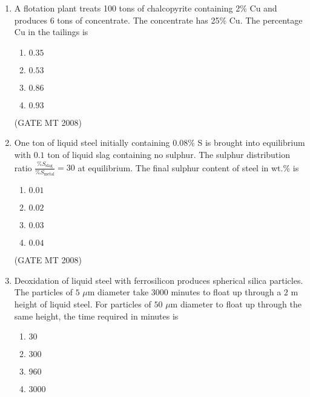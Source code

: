 \documentclass[11pt, letterpaper]{article}
\theoremstyle{remark}
\begin{document}
\begin{enumerate}
\begin{multicols}{4}
\begin{enumerate}
\item P, Q
\item Q, S
\item Q, R
\item P, R
\end{enumerate}
\end{multicols}

\hfill(GATE MT 2008)

\item A flotation plant treats 100 tons of chalcopyrite containing 2\% Cu and produces 6 tons of concentrate. 
The concentrate has 25\% Cu. The percentage Cu in the tailings is
\begin{multicols}{4}
\begin{enumerate}
\item $0.35 $
\item $0.53$ 
\item $0.86$ 
\item $0.93$
\end{enumerate}
\end{multicols}

\hfill(GATE MT 2008)

\item One ton of liquid steel initially containing $0.08$\% S is brought into equilibrium with $0.1$ ton of liquid slag containing no sulphur. The sulphur distribution ratio 
$\displaystyle \frac{\%S_{\text{slag}}}{\%S_{\text{metal}}} = 30$ 
at equilibrium. The final sulphur content of steel in wt.\% is

\begin{multicols}{4}
\begin{enumerate}
\item $0.01$ 
\item $0.02$ 
\item $0.03$ 
\item $0.04$
\end{enumerate}
\end{multicols}

\hfill(GATE MT 2008)  
\item Deoxidation of liquid steel with ferrosilicon produces spherical silica particles. 
The particles of $5$ $\mu$m diameter take $3000$ minutes to float up through a $2$ m height of liquid steel. 
For particles of $50$ $\mu$m diameter to float up through the same height, the time required in minutes is

\begin{multicols}{4}
\begin{enumerate}
\item $30$ 
\item $300$ 
\item $960$ 
\item $3000$
\end{enumerate}
\end{multicols}


\end{enumerate}
\end{document}
